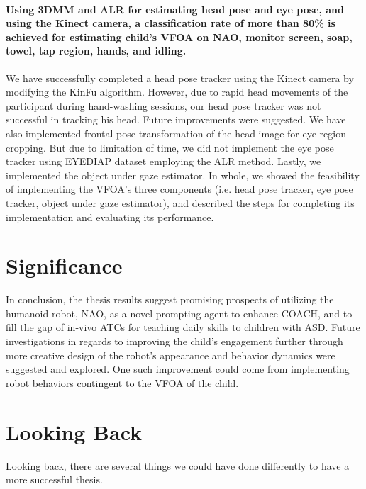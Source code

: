 \paragraph{Using 3DMM and ALR for estimating head pose and eye pose, and using the Kinect camera, a classification rate of more than 80\% is achieved for estimating child's VFOA on NAO, monitor screen, soap, towel, tap region, hands, and idling.}
We have successfully completed a head pose tracker using the Kinect camera by modifying the KinFu algorithm.  However, due to rapid head movements of the participant during hand-washing sessions, our head pose tracker was not successful in tracking his head.  Future improvements were suggested.  We have also implemented frontal pose transformation of the head image for eye region cropping.  But due to limitation of time, we did not implement the eye pose tracker using EYEDIAP dataset employing the ALR method.  Lastly, we implemented the object under gaze estimator.  In whole, we showed the feasibility of implementing the VFOA's three components (i.e. head pose tracker, eye pose tracker, object under gaze estimator), and described the steps for completing its implementation and evaluating its performance.

\section{Significance}
In conclusion, the thesis results suggest promising prospects of utilizing the humanoid robot, NAO, as a novel prompting agent to enhance COACH, and to fill the gap of in-vivo ATCs for teaching daily skills to children with ASD.  Future investigations in regards to improving the child's engagement further through more creative design of the robot's appearance and behavior dynamics were suggested and explored.  One such improvement could come from implementing robot behaviors contingent to the VFOA of the child.

\section{Looking Back}
Looking back, there are several things we could have done differently to have a more successful thesis.


